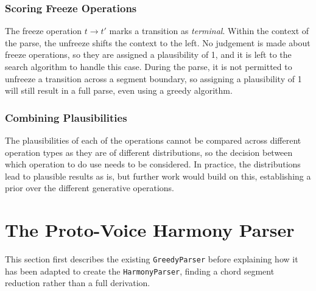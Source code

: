 \documentclass[12pt,a4paper,twoside,openany]{report} \usepackage[pdfborder={0 0 0}]{hyperref}    %
\theoremstyle{definition} \newtheorem{definition}{Definition}[section]
\begin{document}

    \subsubsection{Scoring Freeze Operations} 
    The freeze operation $t \to t'$ marks a transition as \textit{terminal}. Within the context of the parse, the
    unfreeze shifts the context to the left. No judgement is made about freeze operations, so they are assigned
    a plausibility of 1, and it is left to the search algorithm to handle this case. During the parse, it is not
    permitted to unfreeze a transition across a segment boundary, so assigning a plausibility of 1 will still result in
    a full parse, even using a greedy algorithm.

    \subsubsection{Combining Plausibilities} 
    The plausibilities of each of the operations cannot be compared across different operation types as they are of
    different distributions, so the decision between which operation to do use needs to be considered. In practice, the
    distributions lead to plausible results as is, but further work would build on this, establishing a prior
    over the different generative operations.



      \section{The Proto-Voice Harmony Parser}
      \label{sec:protovoiceHarmonyParser}

      This section first describes the existing \texttt{GreedyParser} before explaining how it has been adapted to
      create the \texttt{HarmonyParser}, finding a chord segment reduction rather than a full derivation.
      
\end{document}
